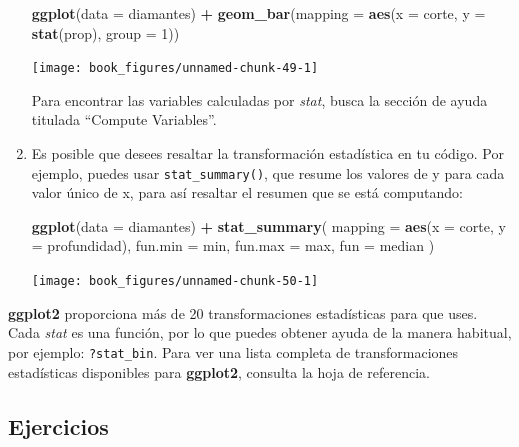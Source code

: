 \documentclass[11pt,oneside]{report}
\newenvironment{Shaded}{\begin{snugshade}}{\end{snugshade}}
\newcommand{\DataTypeTok}[1]{\textcolor[rgb]{0.13,0.29,0.53}{#1}}
\newcommand{\DecValTok}[1]{\textcolor[rgb]{0.00,0.00,0.81}{#1}}
\newcommand{\KeywordTok}[1]{\textcolor[rgb]{0.13,0.29,0.53}{\textbf{#1}}}
\newcommand{\NormalTok}[1]{#1}
\newcommand{\OperatorTok}[1]{\textcolor[rgb]{0.81,0.36,0.00}{\textbf{#1}}}
\newcommand{\StringTok}[1]{\textcolor[rgb]{0.31,0.60,0.02}{#1}}
\begin{document}
\begin{enumerate}
\begin{Shaded}
\begin{Highlighting}[]
\KeywordTok{ggplot}\NormalTok{(}\DataTypeTok{data =}\NormalTok{ diamantes) }\OperatorTok{+}
\StringTok{  }\KeywordTok{geom_bar}\NormalTok{(}\DataTypeTok{mapping =} \KeywordTok{aes}\NormalTok{(}\DataTypeTok{x =}\NormalTok{ corte, }\DataTypeTok{y =} \KeywordTok{stat}\NormalTok{(prop), }\DataTypeTok{group =} \DecValTok{1}\NormalTok{))}
\end{Highlighting}
\end{Shaded}

  \begin{center}\texttt{[image: book\_figures/unnamed-chunk-49-1]} \end{center}

  Para encontrar las variables calculadas por \emph{stat}, busca la
  sección de ayuda titulada ``Compute Variables''.
\item
  Es posible que desees resaltar la transformación estadística en tu
  código. Por ejemplo, puedes usar \texttt{stat\_summary()}, que resume
  los valores de y para cada valor único de x, para así resaltar el
  resumen que se está computando:

\begin{Shaded}
\begin{Highlighting}[]
\KeywordTok{ggplot}\NormalTok{(}\DataTypeTok{data =}\NormalTok{ diamantes) }\OperatorTok{+}
\StringTok{  }\KeywordTok{stat_summary}\NormalTok{(}
    \DataTypeTok{mapping =} \KeywordTok{aes}\NormalTok{(}\DataTypeTok{x =}\NormalTok{ corte, }\DataTypeTok{y =}\NormalTok{ profundidad),}
    \DataTypeTok{fun.min =}\NormalTok{ min,}
    \DataTypeTok{fun.max =}\NormalTok{ max,}
    \DataTypeTok{fun =}\NormalTok{ median}
\NormalTok{  )}
\end{Highlighting}
\end{Shaded}

  \begin{center}\texttt{[image: book\_figures/unnamed-chunk-50-1]} \end{center}
\end{enumerate}

\textbf{ggplot2} proporciona más de 20 transformaciones estadísticas
para que uses. Cada \emph{stat} es una función, por lo que puedes
obtener ayuda de la manera habitual, por ejemplo: \texttt{?stat\_bin}.
Para ver una lista completa de transformaciones estadísticas disponibles
para \textbf{ggplot2}, consulta la hoja de referencia.

\hypertarget{ejercicios-4}{%
\subsection{Ejercicios}\label{ejercicios-4}}
\end{document}
